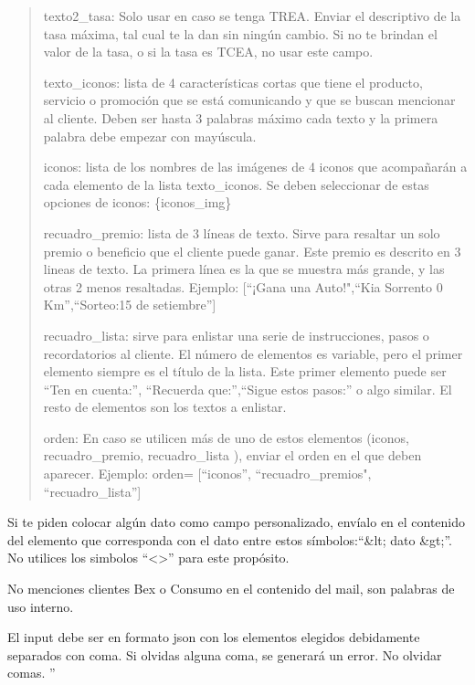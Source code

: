 \begin{quote}
        texto2\_tasa: Solo usar en caso se tenga TREA. Enviar el descriptivo de la tasa máxima, tal cual te la dan sin ningún cambio. Si no te brindan el valor de la tasa, o si la tasa es TCEA, no usar este campo.
        
        texto\_iconos: lista de 4 características cortas que tiene el producto, servicio o promoción que se está comunicando y que se buscan mencionar al cliente. Deben ser hasta 3 palabras máximo cada texto y la primera palabra debe empezar con mayúscula.
        
        iconos: lista de los nombres de las imágenes de 4 iconos que acompañarán a cada elemento de la lista texto\_iconos. Se deben seleccionar de estas opciones de iconos: \{iconos\_img\}
        
        recuadro\_premio: lista de 3 líneas de texto. Sirve para resaltar un solo premio o beneficio que el cliente puede ganar. Este premio es descrito en 3 lineas de texto. La primera línea es la que se muestra más grande, y las otras 2 menos resaltadas. Ejemplo: [``¡Gana una Auto!",``Kia Sorrento 0 Km'',``Sorteo:15 de setiembre'']
        
        recuadro\_lista: sirve para enlistar una serie de instrucciones, pasos o recordatorios al cliente. El número de elementos es variable, pero el primer elemento siempre es el título de la lista. Este primer elemento puede ser ``Ten en cuenta:'', ``Recuerda que:'',``Sigue estos pasos:'' o algo similar. El resto de elementos son los textos a enlistar.
        
        orden: En caso se utilicen más de uno de estos elementos (iconos, recuadro\_premio, recuadro\_lista ), enviar el orden en el que deben aparecer. Ejemplo: orden= [``iconos'', ``recuadro\_premios", \\``recuadro\_lista'']
        \end{quote}
    Si te piden colocar algún dato como campo personalizado, envíalo en el contenido del elemento que corresponda con el dato entre estos símbolos:``\&lt; dato \&gt;''. No utilices los simbolos ``<>'' para este propósito.
    
    No menciones clientes Bex o Consumo en el contenido del mail, son palabras de uso interno.
    
    El input debe ser en formato json con los elementos elegidos debidamente separados con coma. Si olvidas alguna coma, se generará un error. No olvidar comas.
    ''
